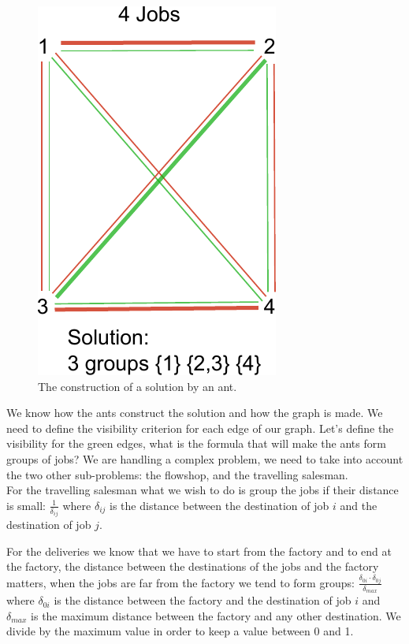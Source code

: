 \documentclass[UTF8, twoside]{EPURapport}
\begin{document}
\begin{figure} [h]
	\centering \includegraphics{images/ant_colony_graph.pdf}
	\caption {The construction of a solution by an ant.}	
	\label {ant_colony_graph}
\end{figure}

	We know how the ants construct the solution and how the graph is made. We need to define the visibility criterion for each edge of our graph. Let's define the visibility for the green edges, what is the formula that will make the ants form groups of jobs? We are handling a complex problem, we need to take into account the two other sub-problems: the flowshop, and the travelling salesman.
\\
	
	For the travelling salesman what we wish to do is group the jobs if their distance is small: $\frac{1}{\delta_{ij}}$ where $\delta_{ij}$ is the distance between the destination of job $i$ and the destination of job $j$. 
	
	For the deliveries we know that we have to start from the factory and to end at the factory, the distance between the destinations of the jobs and the factory matters, when the jobs are far from the factory we tend to form groups: $\frac{\delta_{0i} \cdot \delta_{0j}}{\delta_{max}}$ where $\delta_{0i}$ is the distance between the factory and the destination of job $i$ and $\delta_{max}$ is the maximum distance between the factory and any other destination. We divide by the maximum value in order to keep a value between 0 and 1.
	
\end{document}
